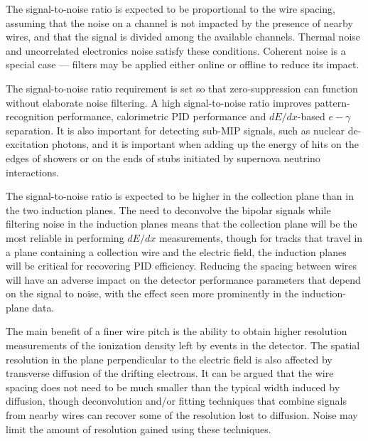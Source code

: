 The signal-to-noise ratio is expected to be proportional to the wire
spacing, assuming that the noise on a channel is not impacted by the
presence of nearby wires, and that the signal is divided among the
available channels.  Thermal noise and uncorrelated electronics noise
satisfy these conditions.  Coherent noise is a special case ---
filters may be applied either online or offline to reduce its impact.

The signal-to-noise ratio requirement is set so that zero-suppression
can function without elaborate noise filtering.  A high
signal-to-noise ratio improves pattern-recognition performance,
calorimetric PID performance and $dE/dx$-based $e-\gamma$ separation.
It is also important for detecting sub-MIP signals, such as nuclear
de-excitation photons, and it is important when adding up the energy
of hits on the edges of showers or on the ends of stubs initiated by
supernova neutrino interactions.

The signal-to-noise ratio is expected to be higher in the collection
plane than in the two induction planes.  The need to deconvolve the
bipolar signals while filtering noise in the induction planes means
that the collection plane will be the most reliable in performing
$dE/dx$ measurements, though for tracks that travel in a plane
containing a collection wire and the electric field, the induction
planes will be critical for recovering PID efficiency.  Reducing the
spacing between wires will have an adverse impact on the detector
performance parameters that depend on the signal to noise, with the
effect seen more prominently in the induction-plane data.

The main benefit of a finer wire pitch is the ability to obtain higher resolution
measurements of the ionization density left by events in the detector.
The spatial resolution in the plane perpendicular to the electric field
is also affected by transverse diffusion of the drifting electrons.
It can be argued that the wire spacing does not need to be much smaller than the typical
width induced by diffusion, though deconvolution and/or fitting techniques
that combine signals from nearby wires can recover some of the resolution lost
to diffusion.  Noise may limit the amount of resolution gained using these techniques.

